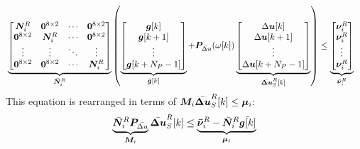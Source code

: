 \begin{align*}
	&
	\underbrace{
		\begin{bmatrix}
			\bm{N}_i^R & \bm{0}^{8\times2} & \cdots & \bm{0}^{8\times2}\\
			\bm{0}^{8\times2} & \bm{N}_i^R & \cdots & \bm{0}^{8\times2}\\
			\vdots & \vdots & \ddots & \vdots\\
			\bm{0}^{8\times2} & \bm{0}^{8\times2} & \cdots & \bm{N}_i^R
		\end{bmatrix}
	}_{\Bar{\bm N}_i^R}
	\left(
	\underbrace{
		\begin{bmatrix}
			\bm g[k]\\
			\bm g[k+1]\\
			\vdots\\
			\bm g[k+N_P-1]
		\end{bmatrix}
	}_{\Bar{\bm g}[k]}
	+
	\bm{P}_{\Bar{\Delta u}}(\omega[k])
	\underbrace{
		\begin{bmatrix}
			\Delta\bm u[k]\\
			\Delta\bm u[k+1]\\
			\vdots\\
			\Delta\bm u[k+N_P-1]
		\end{bmatrix}
	}_{\Bar{\bm{\Delta u}}_S^R[k]}
	\right)
	\le
	\underbrace{
		\begin{bmatrix}
			\bm{\nu}_i^R\\
			\bm{\nu}_i^R\\
			\vdots\\
			\bm{\nu}_i^R
		\end{bmatrix}
	}_{\Bar{\bm{\nu}}_i^R}
\end{align*}
This equation is rearranged in terms of $\bm{M}_i \Bar{\bm{\Delta u}}_S^R[k] \le \bm{\mu}_i$:
\[
\underbrace{\Bar{\bm{N}}_i^R\bm{P}_{\Bar{\Delta u}}}_{\bm{M}_i} \Bar{\bm{\Delta u}}^R_S[k] \le \underbrace{\bm{\Bar{\nu}}^R_i - \Bar{\bm{N}}_i^R \Bar{\bm{g}[k]}}_{\bm{\mu}_i}
\]

